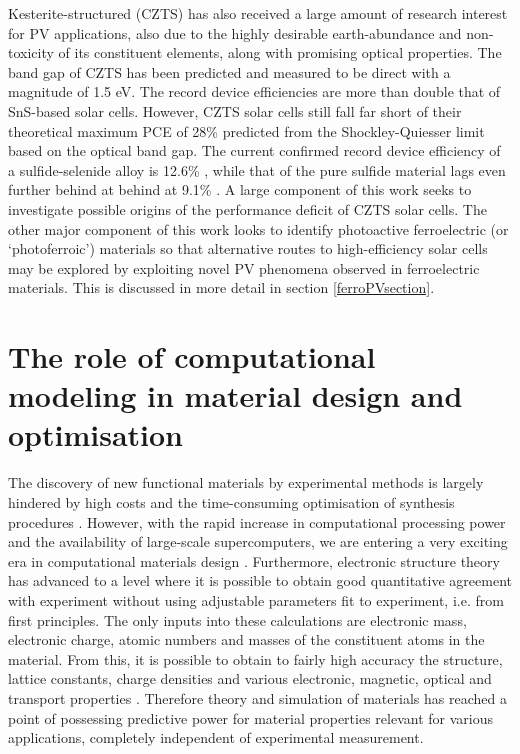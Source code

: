 \documentclass[11pt, twoside]{report}
\begin{document}
Kesterite-structured {\CZTS} (CZTS) has also received a large amount of research interest for PV applications, also due to the highly desirable earth-abundance and non-toxicity of its constituent elements, along with promising optical properties. The band gap of CZTS has been predicted \cite{CZTS_bandgap_theory} and measured \cite{CZTS_bandgap_exp} to be direct with a magnitude of 1.5 eV. 
The record device efficiencies are more than double that of SnS-based solar cells. However, CZTS solar cells still fall far short of their theoretical maximum PCE of 28\% predicted from the Shockley-Quiesser limit based on the optical band gap. The current confirmed record device efficiency of a sulfide-selenide alloy is 12.6\% \cite{Mitzi2017_rev_21}, while that of the pure sulfide material lags even further behind at behind at 9.1\% \cite{CZTS_record}. A large component of this work seeks to investigate possible origins of the performance deficit of CZTS solar cells. The other major component of this work looks to identify photoactive ferroelectric (or `photoferroic') materials so that alternative routes to high-efficiency solar cells may be explored by exploiting novel PV phenomena observed in ferroelectric materials. This is discussed in more detail in section \ref{ferroPVsection}. 


\section{The role of computational modeling in material design and optimisation}
The discovery of new functional materials by experimental methods is largely hindered by high costs and the time-consuming optimisation of synthesis procedures \cite{high_tp}.
However, with the rapid increase in computational processing power and the availability of large-scale supercomputers, we are entering a very exciting era in computational materials design \cite{WMD_material_design_review}. Furthermore, electronic structure theory has advanced to a level where it is possible to obtain good quantitative agreement with experiment without using adjustable parameters fit to experiment, i.e. from first principles. The only inputs into these calculations are electronic mass, electronic charge, atomic numbers and masses of the constituent atoms in the material. From this, it is possible to obtain to fairly high accuracy the structure, lattice constants, charge densities and various electronic, magnetic, optical and transport properties \cite{RichardMartin_Ch1}. Therefore theory and simulation of materials has reached a point of possessing predictive power for material properties relevant for various applications, completely independent of experimental measurement.
\end{document}
